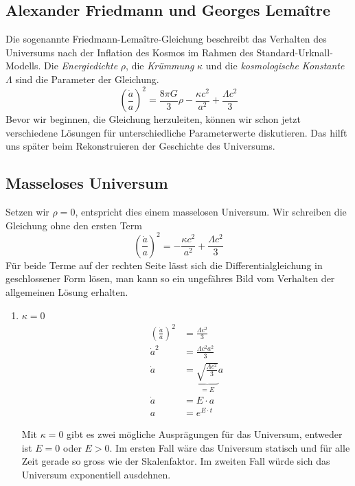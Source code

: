 \begin{refsection}
\section{Alexander Friedmann und Georges Lema\^{i}tre}
Die sogenannte Friedmann-Lema\^{i}tre-Gleichung beschreibt das Verhalten des Universums nach der Inflation des Kosmos im Rahmen des Standard-Urknall-Modells. Die {\em Energiedichte} $\rho$, die {\em Krümmung} $\kappa$ und die {\em kosmologische Konstante} $\Lambda$ sind die Parameter der Gleichung.
\begin{equation}
\left(\frac{\dot{a}}{a}\right) ^2 = \frac{8 \pi G}{3} \rho - \frac{\kappa c^2}{a^2} + \frac{\Lambda c^2}{3}
\end{equation}
Bevor wir beginnen, die Gleichung herzuleiten, können wir schon jetzt verschiedene Lösungen für unterschiedliche Parameterwerte diskutieren. Das hilft uns später beim Rekonstruieren der Geschichte des Universums.

\subsection{Masseloses Universum \label{friedmann:masselosesUniversum}}
Setzen wir $\rho = 0$, entspricht dies einem masselosen Universum.  Wir schreiben die Gleichung ohne den ersten Term
\[\left(\frac{\dot{a}}{a}\right) ^2 = - \frac{\kappa c^2}{a^2} + \frac{\Lambda c^2}{3}\]
Für beide Terme auf der rechten Seite lässt sich die Differentialgleichung in geschlossener Form lösen, man kann so ein ungefähres Bild vom Verhalten der allgemeinen Lösung erhalten.
\begin{enumerate}
	\item $\kappa = 0$ 
		\begin{align}
			\nonumber \left(\frac{\dot{a}}{a}\right) ^2 &= \frac{\Lambda c^2}{3} \\
			\nonumber \dot{a} ^2 &= \frac{\Lambda c^2 a^2}{3}  \\
			\nonumber \dot{a} &= \underbrace{\sqrt{\frac{\Lambda c^2}{3}}}_{=E} a \\
			\nonumber \dot{a} &= E \cdot a \\
			a &= e^{E \cdot t} \label{friedmann:Lambda}
		\end{align}
	
	
Mit $\kappa = 0$ gibt es zwei mögliche Ausprägungen für das Universum, entweder ist $E = 0$ oder $E > 0$. Im ersten Fall wäre das Universum statisch und für alle Zeit gerade so gross wie der Skalenfaktor. Im zweiten Fall würde sich das Universum exponentiell ausdehnen.



\end{enumerate}
\end{refsection}
